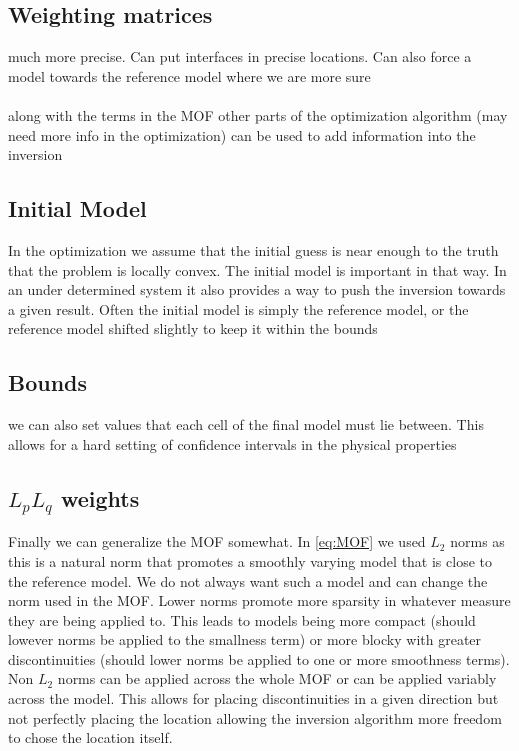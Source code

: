 \subsection{Weighting matrices}
\label{sec:Weighting matrices}

much more precise. Can put interfaces in precise locations. Can also force a model towards the reference model where we are more sure
\\\\
along with the terms in the \ac{MOF} other parts of the optimization algorithm (may need more info in the optimization) can be used to add information into the inversion

\subsection{Initial Model}
\label{sec:Initial Model}

In the optimization we assume that the initial guess is near enough to the truth that the problem is locally convex. The initial model is important in that way. In an under determined system it also provides a way to push the inversion towards a given result. Often the initial model is simply the reference model, or the reference model shifted slightly to keep it within the bounds

\subsection{Bounds}
\label{sec:Bounds}

we can also set values that each cell of the final model must lie between. This allows for a hard setting of confidence intervals in the physical properties

\subsection{$L_p L_q$ weights}
\label{sec:Lp Lq weights}

Finally we can generalize the \ac{MOF} somewhat. In \autoref{eq:MOF} we used $L_2$ norms as this is a natural norm that promotes a smoothly varying model that is close to the reference model. We do not always want such a model and can change the norm used in the \ac{MOF}. Lower norms promote more sparsity in whatever measure they are being applied to. This leads to models being more compact (should lowever norms be applied to the smallness term) or more blocky with greater discontinuities (should lower norms be applied to one or more smoothness terms). Non $L_2$ norms can be applied across the whole \ac{MOF} or can be applied variably across the model. This allows for placing discontinuities in a given direction but not perfectly placing the location allowing the inversion algorithm more freedom to chose the location itself.




